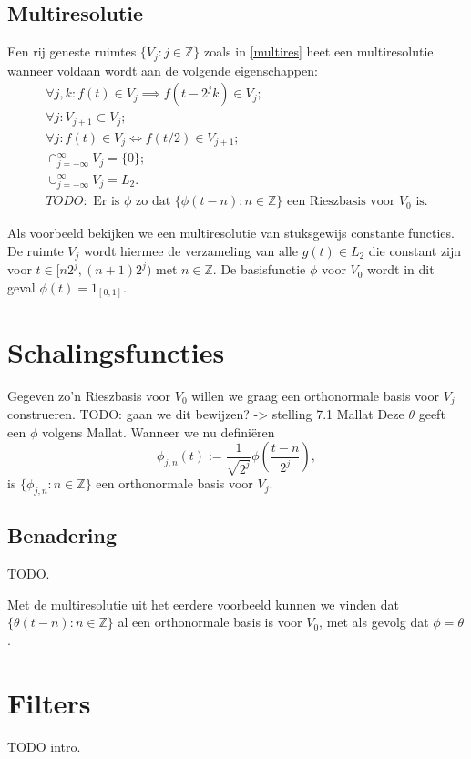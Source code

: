 \documentclass[11pt]{amsart}
\newcommand{\Z}{\mathbb{Z}}
\begin{document}
\subsection{Multiresolutie}
Een rij geneste ruimtes $\{ V_j: j \in \Z \}$ zoals in \eqref{multires} heet een multiresolutie wanneer voldaan wordt aan de volgende eigenschappen:
\[
\begin{array}{c}
  \forall j, k: f(t) \in V_j \implies f(t - 2^j k) \in V_j; \\
  \forall j: V_{j+1} \subset V_j; \\
  \forall j: f(t) \in V_j \iff f(t/2) \in V_{j+1}; \\
  \cap_{j=-\infty}^{\infty} V_{j} = \{0\}; \\
  \cup_{j=-\infty}^{\infty} V_j = L_2. \\
  TODO: \text{ Er is $\phi$ zo dat $\{ \phi(t-n): n \in \Z \}$ een Rieszbasis voor $V_0$ is.}
\end{array}
\]

Als voorbeeld bekijken we een multiresolutie van stuksgewijs constante functies. De ruimte $V_j$ wordt hiermee de verzameling van alle $g(t) \in L_2$ die constant zijn voor $t \in [n 2^j, (n+1)2^j)$ met $n \in \Z$. De basisfunctie $\phi$ voor $V_0$ wordt in dit geval $\phi(t) = 1_{[0,1]}$.

\section{Schalingsfuncties}
Gegeven zo'n Rieszbasis voor $V_0$ willen we graag een orthonormale basis voor $V_j$ construeren. 
TODO: gaan we dit bewijzen? -> stelling 7.1 Mallat
Deze $\theta$ geeft een $\phi$ volgens Mallat. Wanneer we nu defini\"eren
\[
  \phi_{j,n}(t) := \frac{1}{\sqrt{2^j}} \phi\left( \frac{t-n}{2^j} \right),
\]
is $\{ \phi_{j,n}: n \in \Z \}$ een orthonormale basis voor $V_j$.

\subsection{Benadering} TODO.

Met de multiresolutie uit het eerdere voorbeeld kunnen we vinden dat $\{\theta(t-n): n \in \Z \}$ al een orthonormale basis is voor $V_0$, met als gevolg dat $\phi = \theta$.

\section{Filters}
TODO intro.
\end{document}
